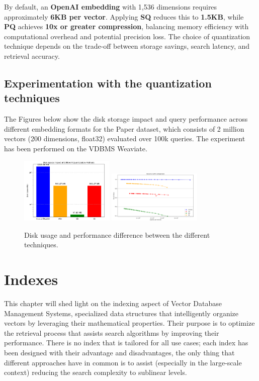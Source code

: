 By default, an \textbf{OpenAI embedding} with 1,536 dimensions requires approximately \textbf{6KB per vector}. Applying \textbf{SQ} reduces this to \textbf{1.5KB}, while \textbf{PQ} achieves \textbf{10x or greater compression}, balancing memory efficiency with computational overhead and potential precision loss. The choice of quantization technique depends on the trade-off between storage savings, search latency, and retrieval accuracy.
\section{Experimentation with the quantization techniques}
The Figures below show the disk storage impact and query performance across different embedding formats for the Paper dataset, which consists of 2 million vectors (200 dimensions, float32) evaluated over 100k queries. The experiment has been performed on the VDBMS Weaviate.
\begin{figure}[h]
    \centering
    \includegraphics[width=0.4\textwidth]{IMAGES/immagine_2025-02-25_105819873.png}
    \includegraphics[width=0.4\textwidth]{IMAGES/immagine_2025-02-25_105043241.png}
    \caption{Disk usage and performance difference between the different techniques.}
    \label{fig:Disk Impact}
\end{figure}










\chapter{Indexes}
\label{chap:Indexes in VBDMS}
This chapter will shed light on the indexing aspect of Vector Database Management Systems, specialized data structures that intelligently organize vectors by leveraging their mathematical properties. Their purpose is to optimize the retrieval process that assists search algorithms by improving their performance. There is no index that is tailored for all use cases; each index has been designed with their advantage and disadvantages, the only thing that different approaches have in common is to assist (especially in the large-scale context) reducing the search complexity to sublinear levels.

